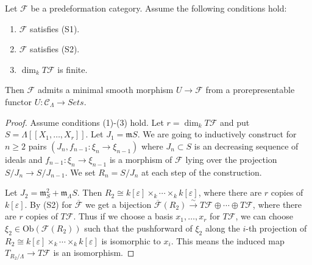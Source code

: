 \begin{lemma}
\label{lemma-miniversal-object-existence-2}
Let $\mathcal{F}$ be a predeformation category.  Assume the following conditions 
hold:
\begin{enumerate}
\item $\mathcal{F}$ satisfies (S1).
\item $\mathcal{F}$ satisfies (S2).
\item $\dim_{k} T\mathcal{F}$ is finite.
\end{enumerate}
Then $\mathcal{F}$ admits a minimal smooth morphism $U \to \mathcal{F}$ 
from a prorepresentable functor $U: \mathcal{C}_\Lambda \to 
\textit{Sets}$.
\end{lemma}

\begin{proof}
Assume conditions (1)-(3) hold.  Let $r = \dim_{k} T\mathcal{F}$ and put $S = 
\Lambda[[X_1, \dots, X_r]]$.  Let $J_{1} = \mathfrak{m}{S}$.  We are going to 
inductively construct for $n \geq 2$ pairs $(J_{n}, f_{n-1}: \xi_{n} 
\to \xi_{n-1})$ where $J_{n} \subset S$ is an decreasing sequence of 
ideals and $f_{n-1}: \xi_{n} \to \xi_{n-1}$ is a morphism of $\mathcal 
F$ lying over the projection $S/J_{n} \to S/J_{n-1}$.  We set $R_{n} = 
S/J_{n}$ at each step of the construction.  

\medskip \noindent
Let $J_{2} = \mathfrak{m}_{S}^2 + \mathfrak{m}_\Lambda S$.  Then $R_2 \cong 
k[\varepsilon] \times_{k} \cdots \times_{k} k[\varepsilon]$, where there are 
$r$ copies of $k[\varepsilon]$.  By (S2) for $\overline{\mathcal{F}}$ we get a 
bijection $\overline{\mathcal{F}}(R_2) \xrightarrow{\sim} T \mathcal{F} \oplus 
\cdots \oplus T \mathcal{F}$, where there are $r$ copies of $T\mathcal{F}$.
Thus if we choose a basis $x_1, \dots, x_r$ for $T\mathcal{F}$, we can choose 
$\xi_{2} \in \text{Ob}(\mathcal{F}(R_2))$ such that the pushforward of 
$\xi_{2}$ along the $i$-th projection of $R_2 \cong k[\varepsilon] \times_{k} 
\cdots \times_{k} k[\varepsilon]$ is isomorphic to $x_i$.  This means the 
induced map $T_{R_{2}/\Lambda} \to T\mathcal{F}$ is an isomorphism.


\end{proof}
